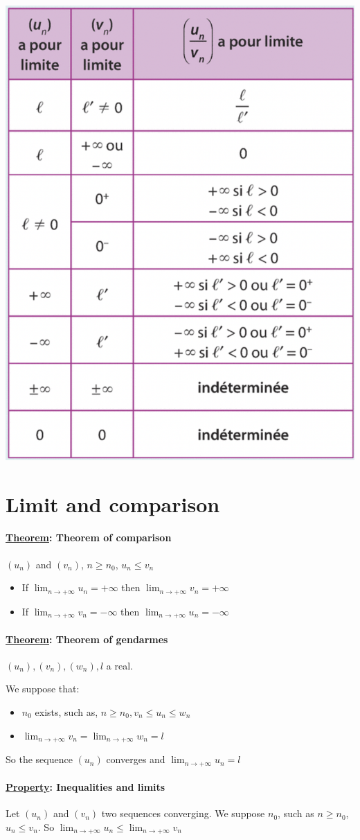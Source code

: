 \documentclass{article}
\newcommand{\property}[1]{\paragraph*{\underline{Property}: #1}}
\newcommand{\theorem}[1]{\paragraph*{\underline{Theorem}: #1}}
\begin{document}
\begin{center}
    \includegraphics[scale=0.35]{quotient_table.png}
\end{center}
\section{Limit and comparison}
\theorem{Theorem of comparison}
$(u_n)$ and $(v_n)$, $n \ge n_0$, $u_n \le v_n$
\begin{itemize}
    \item If $\lim_{n \to +\infty} u_n = +\infty$ then $\lim_{n \to +\infty} v_n = +\infty$
    \item If $\lim_{n \to +\infty} v_n = -\infty$ then $\lim_{n \to +\infty} u_n = -\infty$
\end{itemize}
\theorem{Theorem of gendarmes}
$(u_n), (v_n), (w_n), l$ a real. 

We suppose that:
\begin{itemize}
    \item $n_0$ exists, such as, $n \ge n_0, v_n \le u_n \le w_n$
    \item $\lim_{n \to +\infty} v_n = \lim_{n \to +\infty} w_n = l$
\end{itemize}
So the sequence $(u_n)$ converges and $\lim_{n \to +\infty} u_n = l$
\property{Inequalities and limits}
Let $(u_n)$ and $(v_n)$ two sequences converging. We suppose $n_0$, such as $n \ge n_0$, $u_n \le v_n$. So $\lim_{n \to +\infty} u_n \le \lim_{n \to +\infty} v_n$ 
\end{document}

